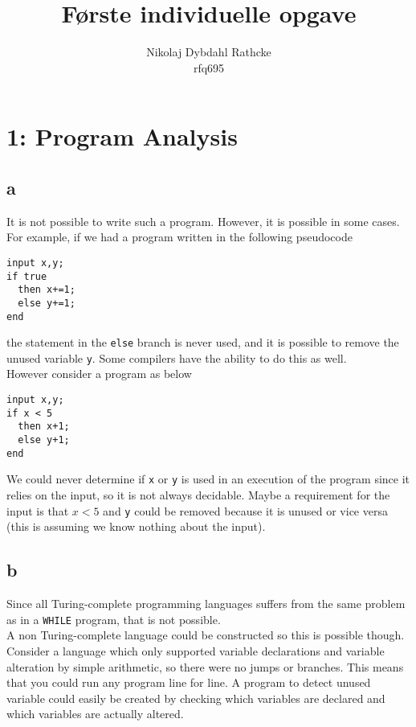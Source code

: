\documentclass[12pt]{article}
\title{Første individuelle opgave}
\author{Nikolaj Dybdahl Rathcke \\ rfq695}
\begin{document}
\maketitle

\section*{1: Program Analysis}
\subsection*{a}
It is not possible to write such a program. However, it is possible in some cases. For example, if we had a program written in the following pseudocode
\begin{verbatim}
input x,y;
if true
  then x+=1;
  else y+=1;
end
\end{verbatim}
the statement in the \texttt{else} branch is never used, and it is possible to remove the unused variable \texttt{y}. Some compilers have the ability to do this as well.\\
However consider a program as below
\begin{verbatim}
input x,y;
if x < 5
  then x+1;
  else y+1;
end
\end{verbatim}
We could never determine if \texttt{x} or \texttt{y} is used in an execution of the program since it relies on the input, so it is not always decidable. Maybe a requirement for the input is that $x<5$ and \texttt{y} could be removed because it is unused or vice versa (this is assuming we know nothing about the input).

\subsection*{b}
Since all Turing-complete programming languages suffers from the same problem as in a \texttt{WHILE} program, that is not possible.\\
A non Turing-complete language could be constructed so this is possible though. Consider a language which only supported variable declarations and variable alteration by simple arithmetic, so there were no jumps or branches. This means that you could run any program line for line. A program to detect unused variable could easily be created by checking which variables are declared and which variables are actually altered.
\end{document}

